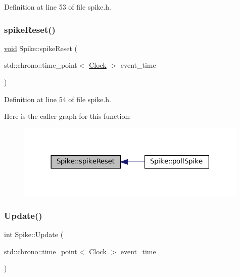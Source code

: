 Definition at line 53 of file spike.\+h.

\mbox{\label{class_spike_acce1cc96e84e7cbf3b68010ab32f045e}} 
\subsubsection{\texorpdfstring{spike\+Reset()}{spikeReset()}}
{\footnotesize\ttfamily \mbox{\hyperlink{glad_8h_a950fc91edb4504f62f1c577bf4727c29}{void}} Spike\+::spike\+Reset (\begin{DoxyParamCaption}\item[{std\+::chrono\+::time\+\_\+point$<$ \mbox{\hyperlink{universe_8h_a0ef8d951d1ca5ab3cfaf7ab4c7a6fd80}{Clock}} $>$}]{event\+\_\+time }\end{DoxyParamCaption})\hspace{0.3cm}{\ttfamily [inline]}}



Definition at line 54 of file spike.\+h.

Here is the caller graph for this function\+:\nopagebreak
\begin{figure}[H]
\begin{center}
\leavevmode
\includegraphics[width=314pt]{class_spike_acce1cc96e84e7cbf3b68010ab32f045e_icgraph}
\end{center}
\end{figure}
\mbox{\label{class_spike_a683a0ca5e62e68777381fc85f4bf3019}} 
\subsubsection{\texorpdfstring{Update()}{Update()}}
{\footnotesize\ttfamily int Spike\+::\+Update (\begin{DoxyParamCaption}\item[{std\+::chrono\+::time\+\_\+point$<$ \mbox{\hyperlink{universe_8h_a0ef8d951d1ca5ab3cfaf7ab4c7a6fd80}{Clock}} $>$}]{event\+\_\+time }\end{DoxyParamCaption})}



